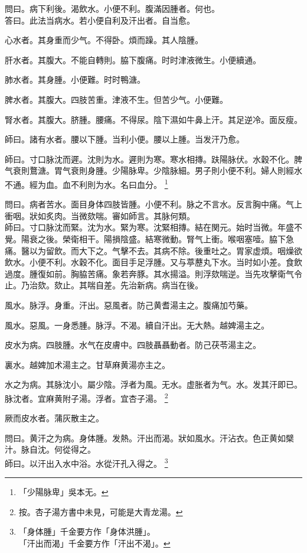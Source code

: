 \documentclass[12pt,oneside,UTF8,b5paper]{ctexbook}她她她她她她她
\begin{document}
問曰。病下利後。渴飲水。小便不利。腹滿因腫者。何也。\\
答曰。此法当病水。若小便自利及汗出者。自当愈。

心水者。其身重而少气。不得卧。煩而躁。其人陰腫。

肝水者。其腹大。不能自轉則。脇下腹痛。时时津液微生。小便續通。

肺水者。其身腫。小便難。时时鴨溏。

脾水者。其腹大。四肢苦重。津液不生。但苦少气。小便難。

腎水者。其腹大。脐腫。腰痛。不得尿。陰下濕如牛鼻上汗。其足逆冷。面反瘦。

師曰。諸有水者。腰以下腫。当利小便。腰以上腫。当发汗乃愈。

師曰。寸口脉沈而遲。沈則为水。遲則为寒。寒水相摶。趺陽脉伏。水穀不化。脾气衰則鶩溏。胃气衰則身腫。少陽脉卑。少陰脉細。男子則小便不利。婦人則經水不通。經为血。血不利則为水。名曰血分。
	\footnote{「少陽脉卑」吳本无。}

問曰。病者苦水。面目身体四肢皆腫。小便不利。脉之不言水。反言胸中痛。气上衝咽。狀如炙肉。当微欬喘。審如師言。其脉何類。\\
師曰。寸口脉沈而緊。沈为水。緊为寒。沈緊相摶。結在関元。始时当微。年盛不覺。陽衰之後。榮衛相干。陽損陰盛。結寒微動。腎气上衝。喉咽塞噎。脇下急痛。醫以为留飲。而大下之。气擊不去。其病不除。後重吐之。胃家虚煩。咽燥欲飲水。小便不利。水穀不化。面目手足浮腫。又与葶藶丸下水。当时如小差。食飲過度。腫復如前。胸脇苦痛。象若奔豚。其水揚溢。則浮欬喘逆。当先攻擊衛气令止。乃治欬。欬止。其喘自差。先治新病。病当在後。

風水。脉浮。身重。汗出。惡風者。防己黄耆湯主之。腹痛加芍藥。

風水。惡風。一身悉腫。脉浮。不渴。續自汗出。无大熱。越婢湯主之。

皮水为病。四肢腫。水气在皮膚中。四肢聶聶動者。防己茯苓湯主之。

裏水。越婢加术湯主之。甘草麻黄湯亦主之。

水之为病。其脉沈小。屬少陰。浮者为風。无水。虚胀者为气。水。发其汗即已。脉沈者。宜麻黄附子湯。浮者。宜杏子湯。
	\footnote{按。杏子湯方書中未見，可能是大青龙湯。}

厥而皮水者。蒲灰散主之。

問曰。黄汗之为病。身体腫。发熱。汗出而渴。狀如風水。汗沾衣。色正黄如檗汁。脉自沈。何從得之。\\
師曰。以汗出入水中浴。水從汗孔入得之。
	\footnote{「身体腫」千金要方作「身体洪腫」。\\「汗出而渴」千金要方作「汗出不渴」。}
\end{document}
